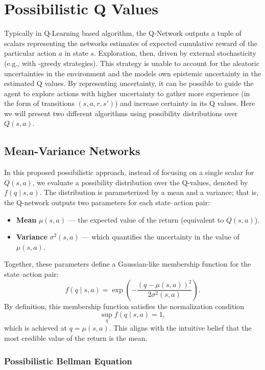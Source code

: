 \documentclass[12pt,a4paper]{report}
\begin{document}
\chapter{Possibilistic Q Values}
Typically in Q-Learning based algorithm, the Q-Network outputs a tuple of scalars representing the networks estimates of expected cumulative reward of the particular action $a$ in state $s$. Exploration, then, driven by external stochasticity (e.g., with \epsilon-greedy strategies). This strategy is unable to account for the aleatoric uncertainties in the environment and the models own epistemic uncertainty in the estimated Q values. By representing uncertainty, it can be possible to guide the agent to explore actions with higher uncertainty to gather more experience (in the form of transitions $(s, a, r, s')$) and increase certainty in its Q values. Here we will present two different algorithms using possibility distributions over $Q(s,a)$. \par


\section{Mean-Variance Networks}

In this proposed possibilistic approach, instead of focusing on a single scalar for \(Q(s,a)\), we evaluate a possibility distribution over the Q-values, denoted by \(f(q \mid s, a)\). The distribution is parameterized by a mean and a variance; that is, the Q-network outputs two parameters for each state–action pair:
\begin{itemize}
  \item \textbf{Mean} \(\mu(s,a)\) --- the expected value of the return (equivalent to \(Q(s,a)\)).
  \item \textbf{Variance} \(\sigma^2(s,a)\) --- which quantifies the uncertainty in the value of \(\mu(s,a)\).
\end{itemize}

Together, these parameters define a Gaussian-like membership function for the state–action pair:
\[
  f(q \mid s, a) = \exp\!\left(-\frac{(q-\mu(s,a))^2}{2\sigma^2(s,a)}\right).
\]
By definition, this membership function satisfies the normalization condition
\[
  \sup_q f(q \mid s, a) = 1,
\]
which is achieved at \(q = \mu(s,a)\). This aligns with the intuitive belief that the most credible value of the return is the mean.

\subsection{Possibilistic Bellman Equation}
\end{document}
